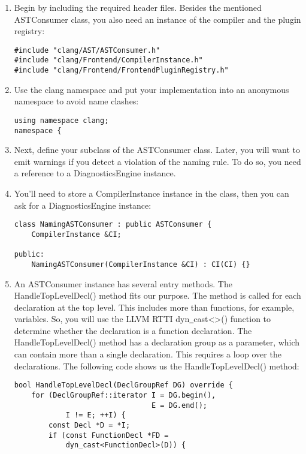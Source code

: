 \begin{enumerate}
\item Begin by including the required header files. Besides the mentioned ASTConsumer class, you also need an instance of the compiler and the plugin registry:
\begin{lstlisting}[caption={}]
#include "clang/AST/ASTConsumer.h"
#include "clang/Frontend/CompilerInstance.h"
#include "clang/Frontend/FrontendPluginRegistry.h"
\end{lstlisting}

\item Use the clang namespace and put your implementation into an anonymous namespace to avoid name clashes:
\begin{lstlisting}[caption={}]
using namespace clang;
namespace {
\end{lstlisting}

\item Next, define your subclass of the ASTConsumer class. Later, you will want to emit warnings if you detect a violation of the naming rule. To do so, you need a reference to a DiagnosticsEngine instance.

\item You'll need to store a CompilerInstance instance in the class, then you can ask for a DiagnosticsEngine instance:
\begin{lstlisting}[caption={}]
class NamingASTConsumer : public ASTConsumer {
	CompilerInstance &CI;
	
public:
	NamingASTConsumer(CompilerInstance &CI) : CI(CI) {}
\end{lstlisting}

\item An ASTConsumer instance has several entry methods. The HandleTopLevelDecl() method fits our purpose. The method is called for each declaration at the top level. This includes more than functions, for example, variables. So, you will use the LLVM RTTI dyn\underline{~}cast<>() function to determine whether the declaration is a function declaration. The HandleTopLevelDecl() method has a declaration group as a parameter, which can contain more than a single declaration. This requires a loop over the declarations. The following code shows us the HandleTopLevelDecl() method:
\begin{lstlisting}[caption={}]
bool HandleTopLevelDecl(DeclGroupRef DG) override {
	for (DeclGroupRef::iterator I = DG.begin(),
								E = DG.end();
			I != E; ++I) {
		const Decl *D = *I;
		if (const FunctionDecl *FD =
			dyn_cast<FunctionDecl>(D)) {
\end{lstlisting}


\end{enumerate}
